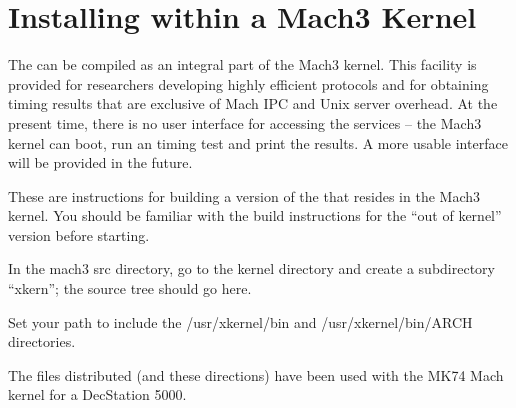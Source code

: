 %
%
%

\section{Installing within a Mach3 Kernel}
\label{installingmachk}

The \xk{} can be compiled as an integral part of the Mach3 kernel.
This facility is provided for researchers developing highly efficient
protocols and for obtaining timing results that are exclusive of
Mach IPC and Unix server overhead.  At the present time, there is no
user interface for accessing the \xk{} services -- the Mach3 kernel
can boot, run an \xk{} timing test and print the results.  A more
usable interface will be provided in the future.

These are instructions for building a version of the \xk{} that resides
in the Mach3 kernel.  You should be familiar with the build instructions
for the ``out of kernel'' version before starting.

In the mach3 src directory, go to the kernel directory and
create a subdirectory ``xkern''; the \xk{} source tree should go here.

Set your path to include the /usr/xkernel/bin and /usr/xkernel/bin/ARCH
directories.

The files distributed (and these directions) have been used with the
MK74 Mach kernel for a DecStation 5000.

